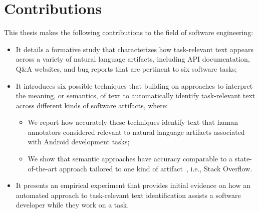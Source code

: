 

\section{Contributions}
\label{cp1:contributions}

This thesis makes the following contributions to the field of software engineering:




\begin{itemize}

    \item It details a formative study that characterizes how task-relevant text appears across a variety of natural language artifacts, including  API documentation, Q\&A websites, and
    bug reports that are pertinent to six software tasks; 

    \item It introduces six possible techniques that building on approaches to interpret the meaning, or semantics, of text
    to automatically identify task-relevant text across different kinds of software artifacts, where:

    \begin{itemize}
        
        \item We report how accurately these techniques identify text that human annotators considered relevant to natural language artifacts associated with Android development tasks; 

        \item We show that semantic approaches have accuracy comparable to a state-of-the-art approach
        tailored to one kind of artifact~\cite{Xu2017}, i.e., Stack Overflow.
    \end{itemize}



    \item It presents an empirical experiment that provides initial evidence on how  
    an automated approach to task-relevant text identification assists a software developer while they work on a task.
\end{itemize}












